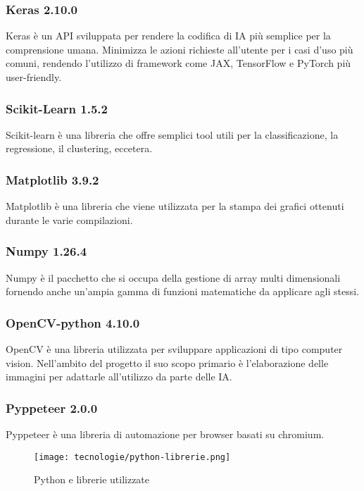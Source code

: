 \subsubsection{Keras 2.10.0}
Keras è un API sviluppata per rendere la codifica di IA più semplice per la comprensione umana. 
Minimizza le azioni richieste all'utente per i casi d'uso più comuni, rendendo l'utilizzo di framework come JAX, TensorFlow e PyTorch più user-friendly.

\subsubsection{Scikit-Learn 1.5.2}
Scikit-learn è una libreria che offre semplici tool utili per la classificazione, la regressione, il clustering, eccetera.

\subsubsection{Matplotlib 3.9.2}
Matplotlib è una libreria che viene utilizzata per la stampa dei grafici ottenuti durante le varie compilazioni. 

\subsubsection{Numpy 1.26.4}
Numpy è il pacchetto che si occupa della gestione di array multi dimensionali fornendo anche un'ampia gamma di funzioni matematiche da applicare agli stessi.

\subsubsection{OpenCV-python 4.10.0}
OpenCV è una libreria utilizzata per sviluppare applicazioni di tipo computer vision. Nell'ambito del progetto il suo scopo primario è l'elaborazione delle immagini per adattarle all'utilizzo da parte delle IA. 

\subsubsection{Pyppeteer 2.0.0}
Pyppeteer è una libreria di automazione per browser basati su chromium.

\begin{figure}[!h] 
  \centering 
  \texttt{[image: tecnologie/python-librerie.png]} 
  \caption{Python e librerie utilizzate}
  \label{fig:logo-python}
\end{figure}


